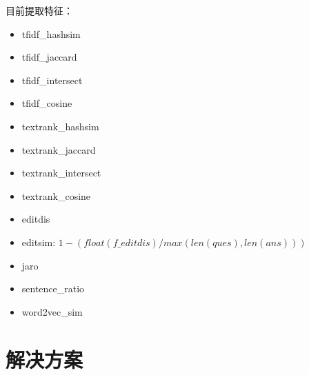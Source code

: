 \documentclass[a4paper,12pt]{report}
\begin{document}
\begin{spacing}{1.5}
目前提取特征：
\begin{itemize}
  \item tfidf\_hashsim
  \item tfidf\_jaccard
  \item tfidf\_intersect
  \item tfidf\_cosine
  \item textrank\_hashsim
  \item textrank\_jaccard
  \item textrank\_intersect
  \item textrank\_cosine
  \item editdis
  \item editsim: $1 - (float(f\_editdis)/max(len(ques), len(ans)))$
  \item jaro
  \item sentence\_ratio
  \item  word2vec\_sim
\end{itemize}

\end{spacing}





\chapter{解决方案}
\end{document}
